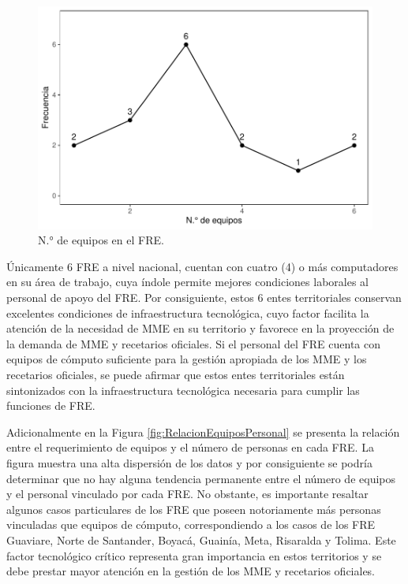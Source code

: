 \documentclass[
  oneside]{book}
\begin{document}
\begin{figure}

{\centering \includegraphics[width=0.85\linewidth]{InformeFinal_files/figure-latex/EquiposComputo-1} 

}

\caption{N.° de equipos en el FRE.}\label{fig:EquiposComputo}
\end{figure}

Únicamente 6 FRE a nivel nacional, cuentan con cuatro (4) o más computadores en su área de trabajo, cuya índole permite mejores condiciones laborales al personal de apoyo del FRE. Por consiguiente, estos 6 entes territoriales conservan excelentes condiciones de infraestructura tecnológica, cuyo factor facilita la atención de la necesidad de MME en su territorio y favorece en la proyección de la demanda de MME y recetarios oficiales. Si el personal del FRE cuenta con equipos de cómputo suficiente para la gestión apropiada de los MME y los recetarios oficiales, se puede afirmar que estos entes territoriales están sintonizados con la infraestructura tecnológica necesaria para cumplir las funciones de FRE.

Adicionalmente en la Figura \ref{fig:RelacionEquiposPersonal} se presenta la relación entre el requerimiento de equipos y el número de personas en cada FRE. La figura muestra una alta dispersión de los datos y por consiguiente se podría determinar que no hay alguna tendencia permanente entre el número de equipos y el personal vinculado por cada FRE. No obstante, es importante resaltar algunos casos particulares de los FRE que poseen notoriamente más personas vinculadas que equipos de cómputo, correspondiendo a los casos de los FRE Guaviare, Norte de Santander, Boyacá, Guainía, Meta, Risaralda y Tolima. Este factor tecnológico crítico representa gran importancia en estos territorios y se debe prestar mayor atención en la gestión de los MME y recetarios oficiales.
\end{document}
